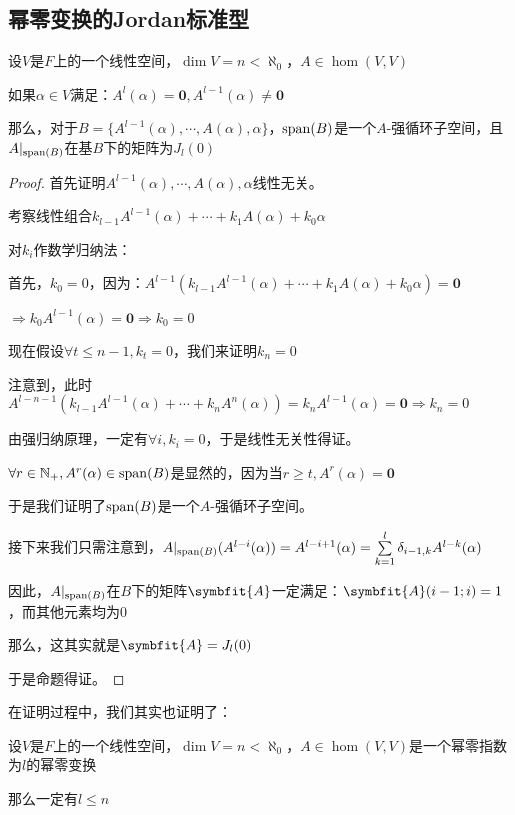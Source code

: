 \documentclass[12pt, a4paper, oneside, UTF8]{ctexbook}
\begin{document}
		\subsection{幂零变换的Jordan标准型}
			\begin{lemma}{}
				设$V$是$F$上的一个线性空间，$\dim V = n < \aleph_0$，$A \in \hom(V,V)$

				如果$\alpha  \in V$满足：$A^l(\alpha )=\mathbf{0},A^{l-1}(\alpha )\neq \mathbf{0}$

				那么，对于$B=\{A^{l-1}(\alpha ),\cdots,A(\alpha ),\alpha \}$，$\operatorname{span}(B)$是一个$A$-强循环子空间，且$A|_{\operatorname{span}(B)}$在基$B$下的矩阵为$J_l(0)$
			\end{lemma}
			\begin{proof}
				首先证明$A^{l-1}(\alpha ),\cdots,A(\alpha ),\alpha $线性无关。

				考察线性组合$k_{l-1}A^{l-1}(\alpha )+\cdots+k_1 A(\alpha )+k_0 \alpha $

				对$k_i$作数学归纳法：

				首先，$k_0=0$，因为：$A^{l-1}(k_{l-1}A^{l-1}(\alpha )+\cdots+k_1 A(\alpha )+k_0\alpha)=\mathbf{0}$

				$\Rightarrow k_0 A^{l-1} (\alpha )=\mathbf{0} \Rightarrow k_0 = 0$

				现在假设$\forall t \leqslant n-1,k_t = 0$，我们来证明$k_n=0$

				注意到，此时$A^{l-n-1}(k_{l-1}A^{l-1}(\alpha )+\cdots+k_n A^n(\alpha ))=k_n A^{l-1}(\alpha )=\mathbf{0} \Rightarrow k_n=0$

				由强归纳原理，一定有$\forall i,k_i = 0$，于是线性无关性得证。

				$\forall r \in \mathbb{N}_+,A^r(\alpha ) \in \operatorname{span}(B)$是显然的，因为当$r \geqslant t,A^r(\alpha )=\mathbf{0}$

				于是我们证明了$\operatorname{span}(B)$是一个$A$-强循环子空间。

				接下来我们只需注意到，$A|_{\operatorname{span}(B)}(A^{l-i}(\alpha ))=A^{l-i+1}(\alpha )=\sum\limits_{k=1}^{l} \delta_{i-1,k}A^{l-k}(\alpha )$

				因此，$A|_{\operatorname{span}(B)}$在$B$下的矩阵$\symbfit{A}$一定满足：$\symbfit{A}(i-1;i)=1$，而其他元素均为$0$

				那么，这其实就是$\symbfit{A}=J_l(0)$

				于是命题得证。
			\end{proof}
			在证明过程中，我们其实也证明了：
			\begin{corollary}{}
				设$V$是$F$上的一个线性空间，$\dim V = n < \aleph_0$，$A \in \hom(V,V)$是一个幂零指数为$l$的幂零变换

				那么一定有$ l \leqslant n$
			\end{corollary}
\end{document}
